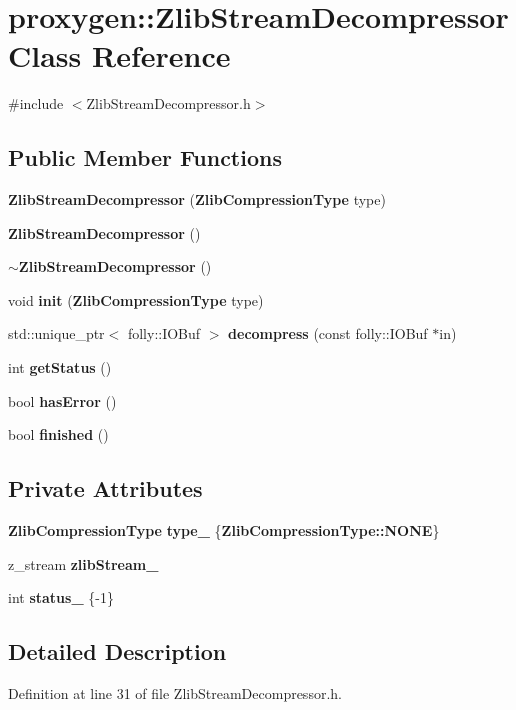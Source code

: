 \section{proxygen\+:\+:Zlib\+Stream\+Decompressor Class Reference}
\label{classproxygen_1_1ZlibStreamDecompressor}


{\ttfamily \#include $<$Zlib\+Stream\+Decompressor.\+h$>$}

\subsection*{Public Member Functions}
\begin{DoxyCompactItemize}
\item 
{\bf Zlib\+Stream\+Decompressor} ({\bf Zlib\+Compression\+Type} type)
\item 
{\bf Zlib\+Stream\+Decompressor} ()
\item 
{\bf $\sim$\+Zlib\+Stream\+Decompressor} ()
\item 
void {\bf init} ({\bf Zlib\+Compression\+Type} type)
\item 
std\+::unique\+\_\+ptr$<$ folly\+::\+I\+O\+Buf $>$ {\bf decompress} (const folly\+::\+I\+O\+Buf $\ast$in)
\item 
int {\bf get\+Status} ()
\item 
bool {\bf has\+Error} ()
\item 
bool {\bf finished} ()
\end{DoxyCompactItemize}
\subsection*{Private Attributes}
\begin{DoxyCompactItemize}
\item 
{\bf Zlib\+Compression\+Type} {\bf type\+\_\+} \{{\bf Zlib\+Compression\+Type\+::\+N\+O\+NE}\}
\item 
z\+\_\+stream {\bf zlib\+Stream\+\_\+}
\item 
int {\bf status\+\_\+} \{-\/1\}
\end{DoxyCompactItemize}


\subsection{Detailed Description}


Definition at line 31 of file Zlib\+Stream\+Decompressor.\+h.



